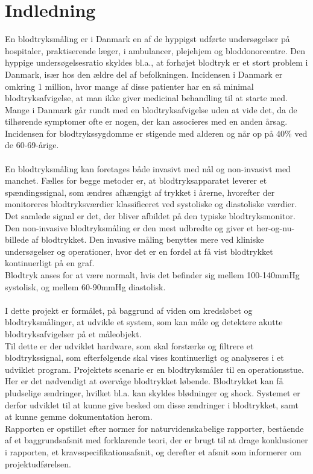 \chapter{Indledning}

En blodtryksmåling er i Danmark en af de hyppigst udførte undersøgelser på hospitaler, praktiserende læger, i ambulancer, plejehjem og bloddonorcentre. 
Den hyppige undersøgelsesratio skyldes bl.a., at forhøjet blodtryk er et stort problem i Danmark, især hos den ældre del af befolkningen. Incidensen i Danmark er omkring 1 million, hvor mange af disse patienter har en så minimal blodtryksafvigelse, at man ikke giver medicinal behandling til at starte med. Mange i Danmark går rundt med en blodtryksafvigelse uden at vide det, da de tilhørende symptomer ofte er nogen, der kan associeres med en anden årsag. Incidensen for blodtrykssygdomme er stigende med alderen og når op på 40\% ved de 60-69-årige.\cite{Statistik} \\
\\
En blodtryksmåling kan foretages både invasivt med nål og non-invasivt med manchet. Fælles for begge metoder er, at blodtryksapparatet leverer et spændingssignal, som ændres afhængigt af trykket i årerne, hvorefter der monitoreres blodtryksværdier klassificeret ved systoliske og diastoliske værdier. Det samlede signal er det, der bliver afbildet på den typiske blodtryksmonitor.\\
Den non-invasive blodtryksmåling er den mest udbredte og giver et her-og-nu-billede af blodtrykket. Den invasive måling benyttes mere ved kliniske undersøgelser og operationer, hvor det er en fordel at få vist blodtrykket kontinuerligt på en graf.\\
 Blodtryk anses for at være normalt, hvis det befinder sig mellem 100-140mmHg systolisk, og mellem 60-90mmHg diastolisk.\cite{normalt blodtryk} \\
 \\
I dette projekt er formålet, på baggrund af viden om kredsløbet og blodtryksmålinger, at udvikle et system, som kan måle og detektere akutte blodtryksafvigelser på et måleobjekt.\\ 
Til dette er der udviklet hardware, som skal forstærke og filtrere et blodtrykssignal, som efterfølgende skal vises kontinuerligt og analyseres i et udviklet program. Projektets scenarie er en blodtryksmåler til en operationsstue. Her er det nødvendigt at overvåge blodtrykket løbende. Blodtrykket kan få pludselige ændringer, hvilket bl.a. kan skyldes blødninger og shock. Systemet er derfor udviklet til at kunne give besked om disse ændringer i blodtrykket, samt at kunne gemme dokumentation herom. \\[1ex]
Rapporten er opstillet efter normer for naturvidenskabelige rapporter, bestående af et baggrundsafsnit med forklarende teori, der er brugt til at drage konklusioner i rapporten, et kravsspecifikationsafsnit, og derefter et afsnit som informerer om projektudførelsen. \\[1ex]


  
